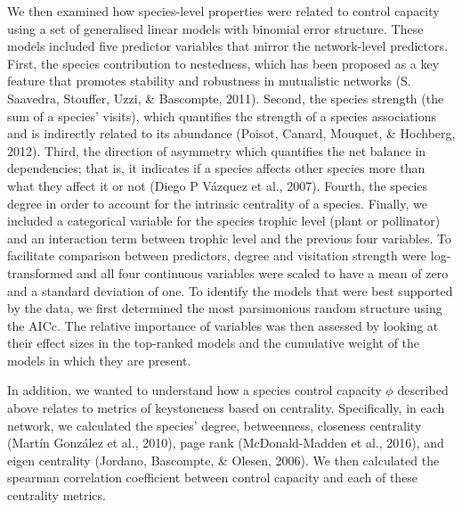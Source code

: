 \documentclass[a4paper]{artikel1}
\theoremstyle{definition}
\theoremstyle{definition}
\theoremstyle{definition}
\theoremstyle{remark}
\begin{document}
We then examined how species-level properties were related to control
capacity using a set of generalised linear models with binomial error
structure. These models included five predictor variables that mirror
the network-level predictors. First, the species contribution to
nestedness, which has been proposed as a key feature that promotes
stability and robustness in mutualistic networks (S. Saavedra, Stouffer,
Uzzi, \& Bascompte, 2011). Second, the species strength (the sum of a
species' visits), which quantifies the strength of a species
associations and is indirectly related to its abundance (Poisot, Canard,
Mouquet, \& Hochberg, 2012). Third, the direction of asymmetry which
quantifies the net balance in dependencies; that is, it indicates if a
species affects other species more than what they affect it or not
(Diego P Vázquez et al., 2007). Fourth, the species degree in order to
account for the intrinsic centrality of a species. Finally, we included
a categorical variable for the species trophic level (plant or
pollinator) and an interaction term between trophic level and the
previous four variables. To facilitate comparison between predictors,
degree and visitation strength were log-transformed and all four
continuous variables were scaled to have a mean of zero and a standard
deviation of one. To identify the models that were best supported by the
data, we first determined the most parsimonious random structure using
the AICc. The relative importance of variables was then assessed by
looking at their effect sizes in the top-ranked models and the
cumulative weight of the models in which they are present.

In addition, we wanted to understand how a species control capacity
\(\phi\) described above relates to metrics of keystoneness based on
centrality. Specifically, in each network, we calculated the species'
degree, betweenness, closeness centrality (Martín González et al.,
2010), page rank (McDonald-Madden et al., 2016), and eigen centrality
(Jordano, Bascompte, \& Olesen, 2006). We then calculated the spearman
correlation coefficient between control capacity and each of these
centrality metrics.
\end{document}
